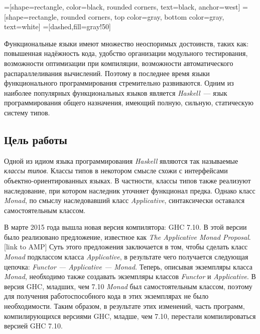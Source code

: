 


    =[shape=rectangle, color=black, rounded corners,%
    text=black, anchor=west]
    =[shape=rectangle, rounded corners,%
    top color=gray,%
    bottom color=gray, text=white]
    =[dashed,fill=gray!50]



\Intro

Функциональные языки имеют множество неоспоримых достоинств, таких как: повышенная надёжность кода, удобство организации модульного тестирования, возможности оптимизации при компиляции, возможности автоматического распараллеливания вычислений. Поэтому в последнее время языки функционального программирования стремительно развиваются. Одним из наиболее популярных функциональных языков является \textit{Haskell}~---  язык программирования общего назначения, имеющий полную, сильную, статическую систему типов.

\subsection*{Цель работы}
Одной из идиом языка программирования \textit{Haskell} являются так называемые \textit{классы типов}. Классы типов в некотором смысле схожи с интерфейсами  объектно-ориентированных языках. В частности, классы типов также реализуют наследование, при котором наследник уточняет функционал предка. Однако класс \textit{Monad}, по смыслу наследовавший класс \textit{Applicative}, синтаксически оставался самостоятельным классом.

В марте 2015 года вышла новая версия компилятора: GHC 7.10. В этой версии было реализовано предложение, известное как \textit{The Applicative Monad Proposal}.[link to AMP] Суть этого предложения заключается в том, чтобы сделать класс \textit{Monad} подклассом класса \textit{Applicative}, в результате чего получается следующая цепочка: \textit{Functor --- Applicative --- Monad}. Теперь, описывая экземпляры класса \textit{Monad}, необходимо также создавать экземпляры классов \textit{Functor} и \textit{Applicative}. В версия GHC, младших, чем 7.10 \textit{Monad} был самостоятельным классом, поэтому для получения работоспособного кода в этих экземплярах не было необходимости. Таким образом, в результате этих изменений, часть программ, компилирующихся версиями GHC, младше, чем 7.10, перестали компилироваться версией GHC 7.10.

